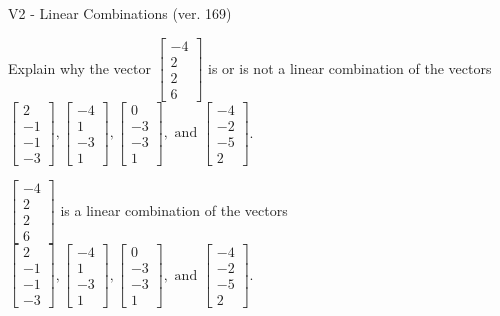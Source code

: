 \begin{exercise}
  \begin{exerciseTitle}V2 - Linear Combinations (ver. 169)\end{exerciseTitle}
  \begin{exerciseStatement}
    Explain why the vector \(\left[\begin{array}{c}
-4 \\
2 \\
2 \\
6
\end{array}\right]\)  is or is not a linear 
	combination of the vectors \(\left[\begin{array}{c}
2 \\
-1 \\
-1 \\
-3
\end{array}\right] , \left[\begin{array}{c}
-4 \\
1 \\
-3 \\
1
\end{array}\right] , \left[\begin{array}{c}
0 \\
-3 \\
-3 \\
1
\end{array}\right] , \text{ and } \left[\begin{array}{c}
-4 \\
-2 \\
-5 \\
2
\end{array}\right]\).
	


  \end{exerciseStatement}
  \begin{exerciseAnswer}
   \(\left[\begin{array}{c}
-4 \\
2 \\
2 \\
6
\end{array}\right]\) 
  	 is  
	a linear combination of the vectors \(\left[\begin{array}{c}
2 \\
-1 \\
-1 \\
-3
\end{array}\right] , \left[\begin{array}{c}
-4 \\
1 \\
-3 \\
1
\end{array}\right] , \left[\begin{array}{c}
0 \\
-3 \\
-3 \\
1
\end{array}\right] , \text{ and } \left[\begin{array}{c}
-4 \\
-2 \\
-5 \\
2
\end{array}\right]\).


\end{exerciseAnswer}
\end{exercise}
